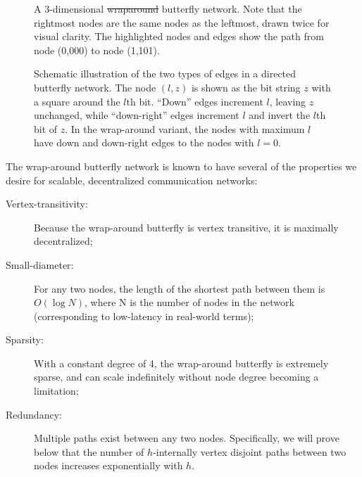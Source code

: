 \documentclass[10pt,letterpaper]{article}
\providecommand{\DIFaddtex}[1]{{\protect\color{blue}\uwave{#1}}} %
\providecommand{\DIFdeltex}[1]{{\protect\color{red}\sout{#1}}}                      %
\providecommand{\DIFdelbegin}{} %
\providecommand{\DIFaddFL}[1]{\DIFadd{#1}} %
\providecommand{\DIFdelFL}[1]{\DIFdel{#1}} %
\providecommand{\DIFaddbeginFL}{} %
\providecommand{\DIFaddendFL}{} %
\providecommand{\DIFdelbeginFL}{} %
\providecommand{\DIFdelendFL}{} %
\providecommand{\DIFadd}[1]{\texorpdfstring{\DIFaddtex{#1}}{#1}} %
\providecommand{\DIFdel}[1]{\texorpdfstring{\DIFdeltex{#1}}{}} %
\begin{document}
\DIFdelbegin %
\DIFdelendFL \DIFaddbeginFL \begin{figure}[H]
\DIFaddendFL \begin{center}
\end{center}
\caption{
A 3-dimensional \DIFdelbeginFL \DIFdelFL{wraparound }\DIFdelendFL \DIFaddbeginFL \DIFaddFL{wrap-around }\DIFaddendFL butterfly network.
Note that the rightmost nodes are the same nodes as the leftmost,
drawn twice for visual clarity.
The highlighted nodes and edges show the path from node (0,000)
to node (1,101).
\label{fig:bf-route}
}
\end{figure}

\begin{figure}[!h]
\begin{center}
\end{center}
\caption{
Schematic illustration of the two types of edges in a directed butterfly
network.
The node $(l,z)$ is shown as the bit string $z$ with a square around the
$l$th bit.
``Down'' edges increment $l$, leaving $z$ unchanged,
while ``down-right'' edges increment $l$ and invert the $l$th bit of $z$.
In the wrap-around variant, the nodes with maximum $l$ have down and down-right
edges to the nodes with $l=0$.
\label{fig:butterfly}
}
\end{figure}

The wrap-around butterfly network is known to have several of the properties
we desire for scalable, decentralized communication networks:
 \begin{description} 
\item[Vertex-transitivity:]
Because the wrap-around butterfly is vertex transitive,
it is maximally decentralized;
\item[Small-diameter:]
For any two nodes, the length of the shortest path between them is
$O(\log N)$, where N is the number of nodes in the network
(corresponding to low-latency in real-world terms);
\item[Sparsity:]
With a constant degree of 4, the wrap-around butterfly is extremely sparse,
and can scale indefinitely without node degree becoming a limitation;
\item [Redundancy:]
Multiple paths exist between any two nodes.
Specifically, we will prove below that the number of
$h$-internally vertex disjoint paths between two
nodes increases exponentially with $h$.
 \end{description} 
\end{document}
